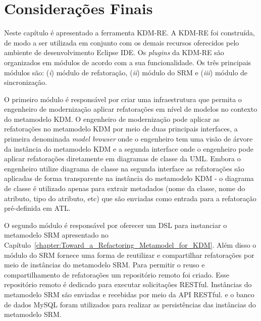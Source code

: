 

\section{Considerações Finais}

Neste capítulo é apresentado a ferramenta KDM-RE. A KDM-RE foi construída, de modo a ser utilizada em conjunto com os demais recursos oferecidos pelo ambiente de desenvolvimento Eclipse IDE. Os \textit{plugins} da KDM-RE são organizados em módulos de acordo com a sua funcionalidade. Os três principais módulos são: (\textit{i}) módulo de refatoração, (\textit{ii}) módulo do SRM e (\textit{iii}) módulo de sincronização. 

O primeiro módulo é responsável por criar uma infraestrutura que permita o engenheiro de modernização aplicar refatorações em nível de modelos no contexto do metamodelo KDM. O engenheiro de modernização pode aplicar as refatorações no metamodelo KDM por meio de duas principais interfaces, a primeira denominada \textit{model browser} onde o engenheiro tem uma visão de árvore da instância do metamodelo KDM e a segunda interface onde o engenheiro pode aplicar refatorações diretamente em diagramas de classe da UML. Embora o engenheiro utilize diagrama de classe na segunda interface as refatorações são aplicadas de forma transparente na instância do metamodelo KDM - o diagrama de classe é utilizado apenas para extrair metadados (nome da classe, nome do atributo, tipo do atributo, etc) que são enviadas como entrada para a refatoração pré-definida em ATL.

O segundo módulo é responsável por oferecer um DSL para instanciar o metamodelo SRM apresentado no Capítulo~\ref{chapter:Toward_a_Refactoring_Metamodel_for_KDM}. Além disso o módulo do SRM fornece uma forma de reutilizar e compartilhar refatorações por meio de instâncias do metamodelo SRM. Para permitir o reuso e compartilhamento de refatorações um repositório remoto foi criado. Esse repositório remoto é dedicado para executar solicitações RESTful. Instâncias do metamodelo SRM são enviadas e recebidas por meio da API RESTful.  e o banco de dados MySQL foram utilizados para realizar as persistências das instâncias do metamodelo SRM.

